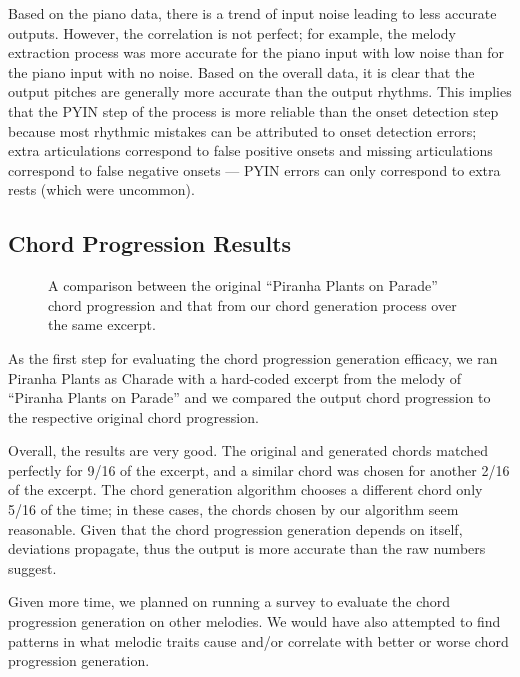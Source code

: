Based on the piano data, there is a trend of input noise leading to less accurate outputs. However, the correlation is not perfect; for example, the melody extraction process was more accurate for the piano input with low noise than for the piano input with no noise. Based on the overall data, it is clear that the output pitches are generally more accurate than the output rhythms. This implies that the PYIN step of the process is more reliable than the onset detection step because most rhythmic mistakes can be attributed to onset detection errors; extra articulations correspond to false positive onsets and missing articulations correspond to false negative onsets --- PYIN errors can only correspond to extra rests (which were uncommon).

\subsection{Chord Progression Results}
\label{sec:chord_progression_results}

\begin{figure}
    \resizebox{\linewidth}{!}{}
    \caption{A comparison between the original ``Piranha Plants on Parade'' chord progression and that from our chord generation process over the same excerpt.}
    \label{fig:chord_progression_pie}
\end{figure}
As the first step for evaluating the chord progression generation efficacy, we ran Piranha Plants as Charade with a hard-coded excerpt from the melody of ``Piranha Plants on Parade'' and we compared the output chord progression to the respective original chord progression.

Overall, the results are very good. The original and generated chords matched perfectly for 9/16 of the excerpt, and a similar chord was chosen for another 2/16 of the excerpt. The chord generation algorithm chooses a different chord only 5/16 of the time; in these cases, the chords chosen by our algorithm seem reasonable. Given that the chord progression generation depends on itself, deviations propagate, thus the output is more accurate than the raw numbers suggest.

Given more time, we planned on running a survey to evaluate the chord progression generation on other melodies. We would have also attempted to find patterns in what melodic traits cause and/or correlate with better or worse chord progression generation.


